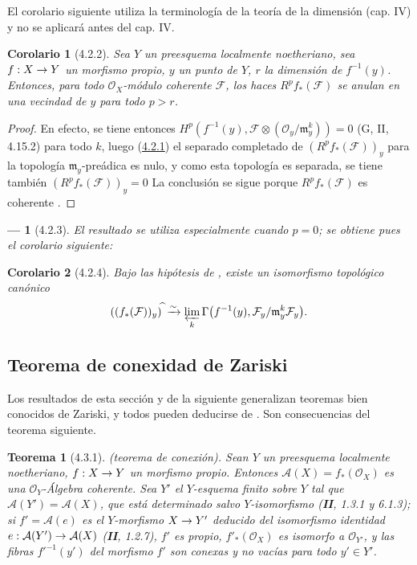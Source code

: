 \documentclass[10pt,oneside,openany]{book}
\theoremstyle{egaenv}\newtheorem*{env}{---}
\theoremstyle{egastatement}
\newtheorem*{theorem}{Teorema}
\newtheorem*{corollary}{Corolario}
\theoremstyle{egadescription}
\newcommand{\oldpage}[2][]{\marginnote{\normalfont\scriptsize\textbf{#1}\,|\,#2}\ignorespaces}
\renewcommand{\to}{\mathchoice{\longrightarrow}{\rightarrow}{\rightarrow}{\rightarrow}}
\begin{document}
El corolario siguiente utiliza la terminología de la teoría de la dimensión
(cap. IV) y no se aplicará antes del cap. IV.

\begin{corollary}[4.2.2]
\label{III.4.2.2}
\label{III.4.2.2-fr}
Sea $Y$ un preesquema localmente noetheriano, sea $f:X\to Y$ un morfismo
propio, $y$ un punto de $Y$, $r$ la dimensión de
$f^{-1}(y)$.
Entonces, para todo $\mathcal O_X$-módulo coherente $\mathcal F$, los haces
$R^pf_*(\mathcal F)$ se anulan en una vecindad de $y$ para todo
$p>r$.
\end{corollary}

\begin{proof}
En efecto, se tiene entonces
$H^p(f^{-1}(y),
\mathcal F\otimes(\mathcal O_y/\mathfrak m_y^k))=0$
(G, II, 4.15.2) para todo $k$, luego
(\hyperref[III.4.2.1-fr]{4.2.1}) el separado completado de
$(R^pf_*(\mathcal F))_y$ para la topología
$\mathfrak m_y$-preádica es nulo, y como esta topología es separada, se tiene también $(R^pf_*(\mathcal F))_y=0$
La conclusión se sigue porque $R^pf_*(\mathcal F)$ es coherente
.
\end{proof}

\begin{env}[4.2.3]
\label{III.4.2.3}
\label{III.4.2.3-fr}
El resultado  se utiliza especialmente cuando $p=0$; se obtiene pues el corolario siguiente:
\end{env}

\begin{corollary}[4.2.4]
\label{III.4.2.4}
\label{III.4.2.4-fr}
Bajo las hipótesis de , existe un isomorfismo
topológico canónico
\[
((f_*(\mathcal F))_y)^{\widehat{\,}}
\xrightarrow{\sim}
\varprojlim_k\Gamma\bigl(f^{-1}(y),
\mathcal F_y/\mathfrak m_y^k\mathcal F_y\bigr).
\]
\end{corollary}


\subsection{Teorema de conexidad de Zariski}
\label{subsection:III.4.3}
\label{subsection:III.4.3-fr}
\label{III.4.3}
\label{III.4.3-fr}

Los resultados de esta sección y de la siguiente generalizan teoremas
bien conocidos de Zariski, y todos pueden deducirse de
. Son consecuencias del teorema siguiente.

\begin{theorem}[4.3.1]
\label{III.4.3.1-fr}
\textnormal{(teorema de conexión).}
Sean $Y$ un preesquema localmente noetheriano, $f:X\to Y$ un morfismo
propio. Entonces $\mathcal A(X)=f_*(\mathcal O_X)$ es una
$\mathcal O_Y$-Álgebra coherente.
\oldpage[III]{131}
Sea $Y'$ el $Y$-esquema finito sobre $Y$ tal que
$\mathcal A(Y')=\mathcal A(X)$, que está determinado salvo $Y$-isomorfismo
\textup{(\textbf{II}, 1.3.1 y 6.1.3)}; si $f'=\mathcal A(e)$ es el $Y$-morfismo
$X\to Y'$ deducido del isomorfismo identidad
$e:\mathcal A(Y')\to\mathcal A(X)$ \textup{(\textbf{II}, 1.2.7)}, $f'$ es propio,
$f'_*(\mathcal O_X)$ es isomorfo a $\mathcal O_{Y'}$, y las fibras
$f'^{-1}(y')$ del morfismo $f'$ son conexas y no vacías para todo
$y'\in Y'$.
\end{theorem}
\end{document}

